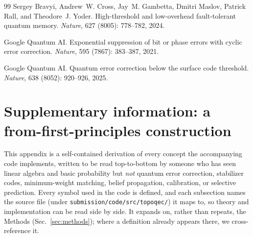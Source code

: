\documentclass[reprint,aps,prxquantum,amsmath,amssymb,floatfix,nofootinbib,longbibliography]{revtex4-2}
\theoremstyle{definition}
\theoremstyle{remark}
\theoremstyle{plain}
\begin{document}
\begin{thebibliography}{99}
Sergey Bravyi, Andrew~W. Cross, Jay~M. Gambetta, Dmitri Maslov, Patrick Rall,
  and Theodore~J. Yoder.
\newblock High-threshold and low-overhead fault-tolerant quantum memory.
\newblock \emph{Nature}, 627 (8005): 778--782, 2024.

{Google Quantum AI}.
\newblock Exponential suppression of bit or phase errors with cyclic error
  correction.
\newblock \emph{Nature}, 595 (7867): 383--387, 2021.

{Google Quantum AI}.
\newblock Quantum error correction below the surface code threshold.
\newblock \emph{Nature}, 638 (8052): 920--926, 2025.

\end{thebibliography}

\appendix

\section{Supplementary information: a from-first-principles construction}
\label{sec:si}

This appendix is a self-contained derivation of every concept the accompanying code implements, written to be read top-to-bottom by someone who has seen linear algebra and basic probability but \emph{not} quantum error correction, stabilizer codes, minimum-weight matching, belief propagation, calibration, or selective prediction. Every symbol used in the code is defined, and each subsection names the source file (under \texttt{submission/code/src/topoqec/}) it maps to, so theory and implementation can be read side by side. It expands on, rather than repeats, the Methods (Sec.~\ref{sec:methods}); where a definition already appears there, we cross-reference it.
\end{document}
